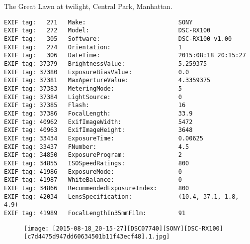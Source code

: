 \section{\protect{}}
\noindent The Great Lawn at twilight, Central Park, Manhattan.
\noindent
\begin{lstlisting}
EXIF tag:   271   Make:                          SONY
EXIF tag:   272   Model:                         DSC-RX100
EXIF tag:   305   Software:                      DSC-RX100 v1.00
EXIF tag:   274   Orientation:                   1
EXIF tag:   306   DateTime:                      2015:08:18 20:15:27
EXIF tag: 37379   BrightnessValue:               5.259375
EXIF tag: 37380   ExposureBiasValue:             0.0
EXIF tag: 37381   MaxApertureValue:              4.3359375
EXIF tag: 37383   MeteringMode:                  5
EXIF tag: 37384   LightSource:                   0
EXIF tag: 37385   Flash:                         16
EXIF tag: 37386   FocalLength:                   33.9
EXIF tag: 40962   ExifImageWidth:                5472
EXIF tag: 40963   ExifImageHeight:               3648
EXIF tag: 33434   ExposureTime:                  0.00625
EXIF tag: 33437   FNumber:                       4.5
EXIF tag: 34850   ExposureProgram:               2
EXIF tag: 34855   ISOSpeedRatings:               800
EXIF tag: 41986   ExposureMode:                  0
EXIF tag: 41987   WhiteBalance:                  0
EXIF tag: 34866   RecommendedExposureIndex:      800
EXIF tag: 42034   LensSpecification:             (10.4, 37.1, 1.8, 4.9)
EXIF tag: 41989   FocalLengthIn35mmFilm:         91

\end{lstlisting}
\clearpage
\begin{figure}
\raggedleft
\texttt{[image: [2015-08-18\_20-15-27][DSC07740][SONY][DSC-RX100][c7d4475d947dd60634501b11f43ecf48].1.jpg]}
\end{figure}


\clearpage
